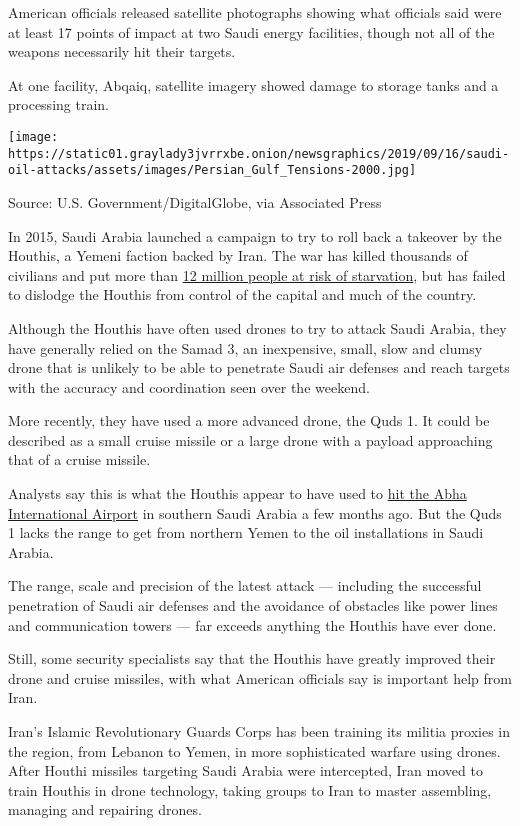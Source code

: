 American officials released satellite photographs showing what officials
said were at least 17 points of impact at two Saudi energy facilities,
though not all of the weapons necessarily hit their targets.

At one facility, Abqaiq, satellite imagery showed damage to storage
tanks and a processing train.

\texttt{[image: https://static01.graylady3jvrrxbe.onion/newsgraphics/2019/09/16/saudi-oil-attacks/assets/images/Persian\_Gulf\_Tensions-2000.jpg]}

Source: U.S. Government/DigitalGlobe, via Associated Press

In 2015, Saudi Arabia launched a campaign to try to roll back a takeover
by the Houthis, a Yemeni faction backed by Iran. The war has killed
thousands of civilians and put more than
\href{https://www.nytimes3xbfgragh.onion/interactive/2018/10/26/world/middleeast/saudi-arabia-war-yemen.html}{12
million people at risk of starvation}, but has failed to dislodge the
Houthis from control of the capital and much of the country.

Although the Houthis have often used drones to try to attack Saudi
Arabia, they have generally relied on the Samad 3, an inexpensive,
small, slow and clumsy drone that is unlikely to be able to penetrate
Saudi air defenses and reach targets with the accuracy and coordination
seen over the weekend.

More recently, they have used a more advanced drone, the Quds 1. It
could be described as a small cruise missile or a large drone with a
payload approaching that of a cruise missile.

Analysts say this is what the Houthis appear to have used to
\href{https://www.nytimes3xbfgragh.onion/2019/06/12/world/middleeast/saudi-airport-attack.html}{hit
the Abha International Airport} in southern Saudi Arabia a few months
ago. But the Quds 1 lacks the range to get from northern Yemen to the
oil installations in Saudi Arabia.

The range, scale and precision of the latest attack --- including the
successful penetration of Saudi air defenses and the avoidance of
obstacles like power lines and communication towers --- far exceeds
anything the Houthis have ever done.

Still, some security specialists say that the Houthis have greatly
improved their drone and cruise missiles, with what American officials
say is important help from Iran.

Iran's Islamic Revolutionary Guards Corps has been training its militia
proxies in the region, from Lebanon to Yemen, in more sophisticated
warfare using drones. After Houthi missiles targeting Saudi Arabia were
intercepted, Iran moved to train Houthis in drone technology, taking
groups to Iran to master assembling, managing and repairing drones.

